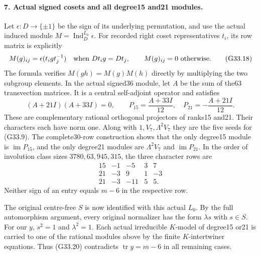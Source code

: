 \paragraph{7. Actual signed cosets and all degree15 and21 modules.}
Let \(\epsilon:D\to\{\pm1\}\) be the sign of its underlying
permutation, and use the actual induced module
\(M=\operatorname{Ind}_D^{L_0}\epsilon\). For recorded right
coset representatives \(t_i\), its row matrix is explicitly
\[
 M(g)_{ij}=\epsilon(t_i g t_j^{-1})
       \quad\hbox{when }Dt_i g=Dt_j,
       \qquad M(g)_{ij}=0\hbox{ otherwise}.                \tag{G33.18}
\]
The formula verifies \(M(gh)=M(g)M(h)\) directly by multiplying
the two subgroup elements. In the actual signed36 module,
let \(A\) be the sum of the63 transvection matrices. It is a
central self-adjoint operator and satisfies
\[
 (A+21I)(A+33I)=0,\qquad
 P_{15}=\frac{A+33I}{12},\quad
 P_{21}=-\frac{A+21I}{12}.                                  \tag{G33.19}
\]
These are complementary rational orthogonal projectors of
ranks15 and21. Their characters each have norm one. Along
with \(1,V_7,\Lambda^2V_7\) they are the five seeds for
(G33.9). The complete30-row construction shows that the only
degree15 module is \(\operatorname{im}P_{15}\), and the only
degree21 modules are \(\Lambda^2V_7\) and
\(\operatorname{im}P_{21}\). In the order of involution class
sizes \(3780,63,945,315\), the three character rows are
\[
\begin{array}{c|rrrr}
15&-1&-5&3&7\\
21&-3&9&1&-3\\
21&-3&-11&5&5.
\end{array}                                                   \tag{G33.20}
\]
Neither sign of an entry equals \(m-6\) in the respective row.

The original centre-free \(S\) is now identified with this
actual \(L_0\). By the full automorphism argument, every
original normalizer has the form \(\lambda s\) with \(s\in S\).
For our \(y\), \(s^2=1\) and \(\lambda^2=1\). Each actual
irreducible \(K\)-model of degree15 or21 is carried to one of
the rational modules above by the finite \(K\)-intertwiner
equations. Thus (G33.20) contradicts \(\operatorname{tr}y=m-6\)
in all remaining cases.

